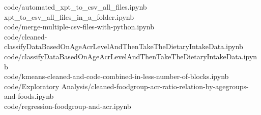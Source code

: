 \flushleft \justifying code/automated\_xpt\_to\_csv\_all\_files.ipynb \\
xpt\_to\_csv\_all\_files\_in\_a\_folder.ipynb \\
code/merge-multiple-csv-files-with-python.ipynb \\
code/cleaned-classifyDataBasedOnAgeAcrLevelAndThenTakeTheDietaryIntakeData.ipynb \\
code/classifyDataBasedOnAgeAcrLevelAndThenTakeTheDietaryIntakeData.ipynb \\
code/kmeans-cleaned-and-code-combined-in-less-number-of-blocks.ipynb \\
code/Exploratory Analysis/cleaned-foodgroup-acr-ratio-relation-by-agegroups-and-foods.ipynb \\
code/regression-foodgroup-and-acr.ipynb \\





